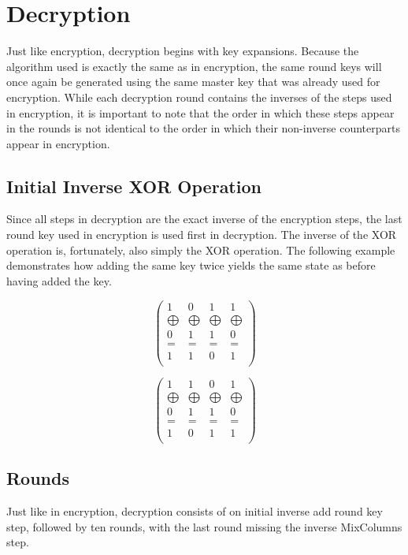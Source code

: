 \documentclass[12pt, a4paper]{report}
\theoremstyle{definition}
\theoremstyle{remark}
\begin{document}
\section{Decryption}
Just like encryption, decryption begins with key expansions. Because the algorithm used is exactly the same as in encryption, the same round keys will once again be generated using the same master key that was already used for encryption. While each decryption round contains the inverses of the steps used in encryption, it is important to note that the order in which these steps appear in the rounds is not identical to the order in which their non-inverse counterparts appear in encryption.

\subsection{Initial Inverse XOR Operation}
\label{InvXOR}
Since all steps in decryption are the exact inverse of the encryption steps, the last round key used in encryption is used first in decryption\cite{RoundKeyInverse}. The inverse of the XOR operation is, fortunately, also simply the XOR operation. The following example demonstrates how adding the same key twice yields the same state as before having added the key.

\[
\left( \begin{array}{cccc}
1 & 0 & 1 & 1 \\
\bigoplus & \bigoplus & \bigoplus & \bigoplus \\
0 & 1 & 1 & 0 \\
= & = & = & = \\
1 & 1 & 0 & 1 \\
\end{array} \right)
\]

\[
\left( \begin{array}{cccc}
1 & 1 & 0 & 1 \\
\bigoplus & \bigoplus & \bigoplus & \bigoplus \\
0 & 1 & 1 & 0 \\
= & = & = & = \\
1 & 0 & 1 & 1 \\
\end{array} \right)
\]

\subsection{Rounds}
Just like in encryption, decryption consists of on initial inverse add round key step, followed by ten rounds, with the last round missing the inverse MixColumns step.
\end{document}
